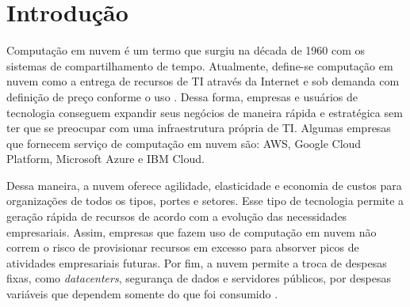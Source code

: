 \chapter{Introdução}\label{chapter:introducao}

Computação em nuvem é um termo que surgiu na década de 1960 com os sistemas de compartilhamento de tempo. Atualmente, define-se computação em nuvem como a entrega de recursos de TI através da Internet e sob demanda com definição de preço conforme o uso \cite{ref:000}. Dessa forma, empresas e usuários de tecnologia conseguem expandir seus negócios de maneira rápida e estratégica sem ter que se preocupar com uma infraestrutura própria de TI. Algumas empresas que fornecem serviço de computação em nuvem são: AWS, Google Cloud Platform, Microsoft Azure e IBM Cloud.

Dessa maneira, a nuvem oferece agilidade, elasticidade e economia de custos para organizações de todos os tipos, portes e setores. Esse tipo de tecnologia permite a geração rápida de recursos de acordo com a evolução das necessidades empresariais. Assim, empresas que fazem uso de computação em nuvem não correm o risco de provisionar recursos em excesso para absorver picos de atividades empresariais futuras. Por fim, a nuvem permite a troca de despesas fixas, como \textit{datacenters}, segurança de dados e servidores públicos, por despesas variáveis que dependem somente do que foi consumido \cite{ref:000}.




